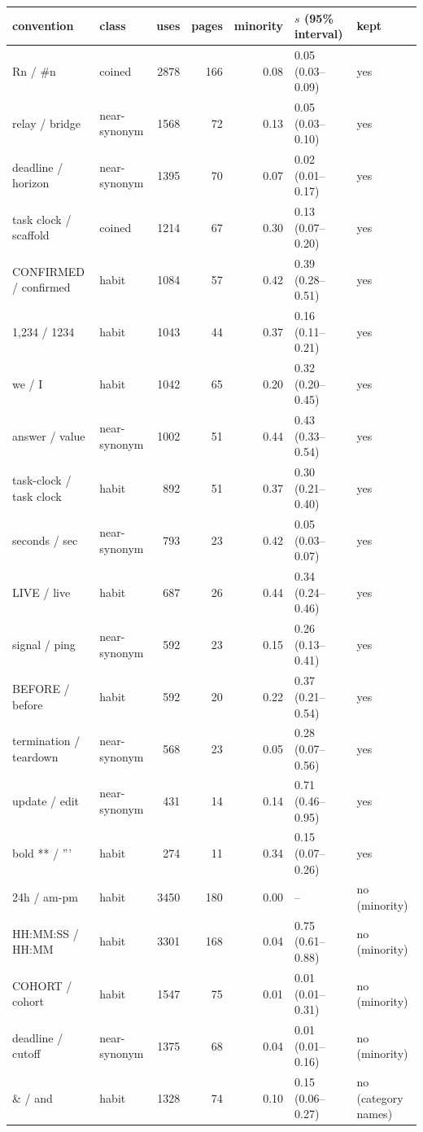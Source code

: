 \begin{tabular}{llrrrll}
\toprule
convention & class & uses & pages & minority & $s$ (95\% interval) & kept \\
\midrule
Rn / \#n & coined & 2878 & 166 & 0.08 & 0.05 (0.03--0.09) & yes \\
relay / bridge & near-synonym & 1568 & 72 & 0.13 & 0.05 (0.03--0.10) & yes \\
deadline / horizon & near-synonym & 1395 & 70 & 0.07 & 0.02 (0.01--0.17) & yes \\
task clock / scaffold & coined & 1214 & 67 & 0.30 & 0.13 (0.07--0.20) & yes \\
CONFIRMED / confirmed & habit & 1084 & 57 & 0.42 & 0.39 (0.28--0.51) & yes \\
1,234 / 1234 & habit & 1043 & 44 & 0.37 & 0.16 (0.11--0.21) & yes \\
we / I & habit & 1042 & 65 & 0.20 & 0.32 (0.20--0.45) & yes \\
answer / value & near-synonym & 1002 & 51 & 0.44 & 0.43 (0.33--0.54) & yes \\
task-clock / task clock & habit & 892 & 51 & 0.37 & 0.30 (0.21--0.40) & yes \\
seconds / sec & near-synonym & 793 & 23 & 0.42 & 0.05 (0.03--0.07) & yes \\
LIVE / live & habit & 687 & 26 & 0.44 & 0.34 (0.24--0.46) & yes \\
signal / ping & near-synonym & 592 & 23 & 0.15 & 0.26 (0.13--0.41) & yes \\
BEFORE / before & habit & 592 & 20 & 0.22 & 0.37 (0.21--0.54) & yes \\
termination / teardown & near-synonym & 568 & 23 & 0.05 & 0.28 (0.07--0.56) & yes \\
update / edit & near-synonym & 431 & 14 & 0.14 & 0.71 (0.46--0.95) & yes \\
bold ** / ''' & habit & 274 & 11 & 0.34 & 0.15 (0.07--0.26) & yes \\
24h / am-pm & habit & 3450 & 180 & 0.00 & -- & no (minority) \\
HH:MM:SS / HH:MM & habit & 3301 & 168 & 0.04 & 0.75 (0.61--0.88) & no (minority) \\
COHORT / cohort & habit & 1547 & 75 & 0.01 & 0.01 (0.01--0.31) & no (minority) \\
deadline / cutoff & near-synonym & 1375 & 68 & 0.04 & 0.01 (0.01--0.16) & no (minority) \\
\& / and & habit & 1328 & 74 & 0.10 & 0.15 (0.06--0.27) & no (category names) \\

\end{tabular}
